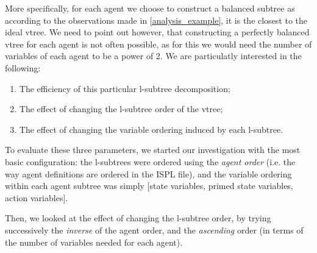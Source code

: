 \documentclass[11pt]{report}
\begin{document}
More specifically, for each agent we choose to construct a balanced subtree as according to the observations made in \ref{analysis_example}, it is the closest to the ideal vtree. We need to point out however, that constructing a perfectly balanced vtree for each agent is not often possible, as for this we would need the number of variables of each agent to be a power of 2.
We are particulatly interested in the following: \begin{enumerate}
\item The efficiency of this particular l-subtree decomposition;
\item The effect of changing the l-subtree order of the vtree;
\item The effect of changing the variable ordering induced by each l-subtree. 
\end{enumerate}
To evaluate these three parameters, we started our investigation with the most basic configuration: the l-subtrees were ordered using the \textit{agent order} (i.e. the way agent definitions are ordered in the ISPL file), and the variable ordering within each agent subtree was simply [state variables, primed state variables, action variables].

Then, we looked at the effect of changing the l-subtree order, by trying successively the \textit{inverse} of the agent order, and the \textit{ascending }order (in terms of the number of variables needed for each agent).
\end{document}
